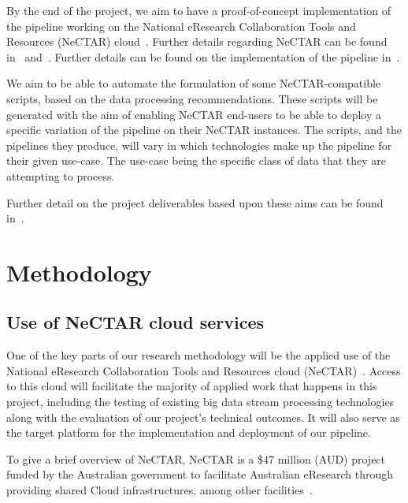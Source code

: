 \documentclass[a4paper,11pt]{article}
\begin{document}
By the end of the project, we aim to have a proof-of-concept implementation of the pipeline working on the National
eResearch Collaboration Tools and Resources (NeCTAR) cloud~\cite{web:Nectar}. Further details regarding NeCTAR can be
found in~ and~. Further details can be found on the
implementation of the pipeline in~.

We aim to be able to automate the formulation of some NeCTAR-compatible scripts, based on the data processing
recommendations. These scripts will be generated with the aim of enabling NeCTAR end-users to be able to deploy a
specific variation of the pipeline on their NeCTAR instances. The scripts, and the pipelines they produce, will vary in
which technologies make up the pipeline for their given use-case. The use-case being the specific class of data that
they are attempting to process.

Further detail on the project deliverables based upon these aims can be found in~.




\newpage


\section{Methodology} %
\label{sec:methodology}

\subsection{Use of NeCTAR cloud services} %
\label{sub:use_of_nectar_cloud_services}

One of the key parts of our research methodology will be the applied use of the National eResearch Collaboration Tools
and Resources cloud (NeCTAR)~\cite{web:Nectar}. Access to this cloud will facilitate the majority of applied work that
happens in this project, including the testing of existing big data stream processing technologies along with the
evaluation of our project's technical outcomes. It will also serve as the target platform for the implementation and
deployment of our pipeline.

To give a brief overview of NeCTAR, NeCTAR is a \$47 million (AUD) project funded by the Australian government to
facilitate Australian eResearch through providing shared Cloud infrastructures, among other
facilities~\cite{sinnott_towards_2011}.
\end{document}
